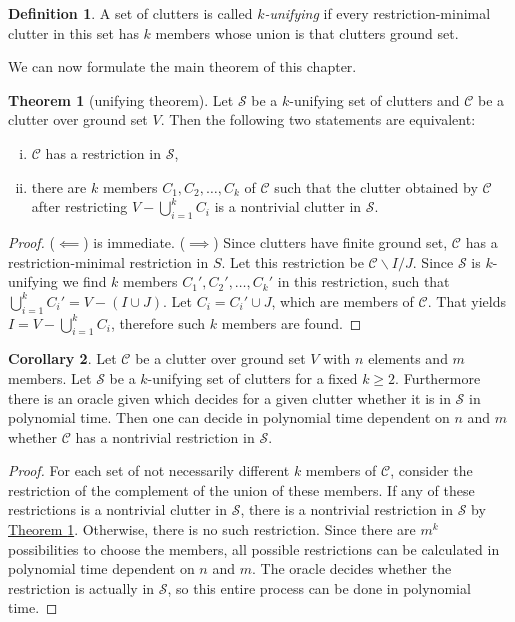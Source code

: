 \documentclass[a4paper, 12pt, twoside=false]{scrbook}
\theoremstyle{definition}
\newtheorem*{definition}{Definition}
\newtheorem{theorem}{Theorem}[chapter]
\newtheorem{corollary}[theorem]{Corollary}
\begin{document}
   \begin{definition}
       A set of clutters is called \emph{$k$-unifying} if every restriction-minimal clutter in this set has $k$ members whose union is that clutters ground set.
   \end{definition}

   We can now formulate the main theorem of this chapter.

   \begin{theorem}[unifying theorem]\label{unifying}
       Let $\mathcal{S}$ be a $k$-unifying set of clutters and $\mathcal{C}$ be a clutter over ground set $V$.
       Then the following two statements are equivalent:
       \leavevmode
       \begin{enumerate}[(i)]
           \item $\mathcal{C}$ has a restriction in $\mathcal{S}$,
           \item there are $k$ members $C_1, C_2, \ldots, C_k$ of $\mathcal{C}$ such that the clutter obtained by $\mathcal{C}$ after restricting $V - \bigcup_{i=1}^k C_i$ is a nontrivial clutter in $\mathcal{S}$.
       \end{enumerate}
   \end{theorem}

   \begin{proof}
       ($\impliedby$) is immediate.
       ($\implies$) Since clutters have finite ground set, $\mathcal{C}$ has a restriction-minimal restriction in $S$.
       Let this restriction be $\mathcal{C}\backslash I / J$.
       Since $\mathcal{S}$ is $k$-unifying we find $k$ members $C_1', C_2', \ldots, C_k'$ in this restriction, such that $\bigcup_{i=1}^k C_i' = V - (I \cup J)$.
       Let $C_i = C_i' \cup J$, which are members of $\mathcal{C}$.
       That yields $I=V-\bigcup_{i=1}^k C_i$, therefore such $k$ members are found.
   \end{proof}
   \begin{corollary}
       Let $\mathcal{C}$ be a clutter over ground set $V$ with $n$ elements and $m$ members.
       Let $\mathcal{S}$ be a $k$-unifying set of clutters for a fixed $k\geq 2$.
       Furthermore there is an oracle given which decides for a given clutter whether it is in $\mathcal{S}$ in polynomial time.
       Then one can decide in polynomial time dependent on $n$ and $m$ whether $\mathcal{C}$ has a nontrivial restriction in $\mathcal{S}$.
   \end{corollary}

   \begin{proof}
       For each set of not necessarily different $k$ members of $\mathcal{C}$, consider the restriction of the complement of the union of these members.
       If any of these restrictions is a nontrivial clutter in $\mathcal{S}$, there is a nontrivial restriction in $\mathcal{S}$ by \hyperref[unifying]{Theorem \ref*{unifying}}.
       Otherwise, there is no such restriction.
       Since there are $m^k$ possibilities to choose the members, all possible restrictions can be calculated in polynomial time dependent on $n$ and $m$. The oracle decides whether the restriction is actually in $\mathcal{S}$, so this entire process can be done in polynomial time.
   \end{proof}
\end{document}
